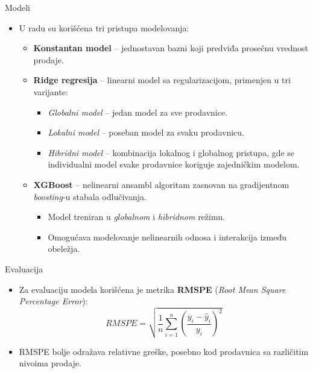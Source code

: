 \documentclass[serif, aspectratio=169]{beamer}
\begin{document}
\begin{frame}{Modeli}
\begin{itemize}
    \item U radu su korišćena tri pristupa modelovanja:
    \begin{itemize}
        \item \textbf{Konstantan model} – jednostavan bazni koji predviđa prosečnu vrednost prodaje.
        \vspace{0.3em}
        \item \textbf{Ridge regresija} – linearni model sa regularizacijom, primenjen u tri varijante:
        \begin{itemize}
            \item \textit{Globalni model} – jedan model za sve prodavnice.
            \item \textit{Lokalni model} – poseban model za svaku prodavnicu.
            \item \textit{Hibridni model} – kombinacija lokalnog i globalnog pristupa, gde se individualni model svake prodavnice koriguje zajedničkim modelom.
        \end{itemize}

        \item \textbf{XGBoost} – nelinearni ansambl algoritam zasnovan na gradijentnom \textit{boosting}-u stabala odlučivanja.
        \begin{itemize}
            \item Model treniran u \textit{globalnom} i \textit{hibridnom} režimu.
            \item Omogućava modelovanje nelinearnih odnosa i interakcija između obeležja.
        \end{itemize}
    \end{itemize}
\end{itemize}
\end{frame}

\begin{frame}{Evaluacija}
\begin{itemize}

    \vspace{1em}

    \item Za evaluaciju modela korišćena je metrika \textbf{RMSPE} (\textit{Root Mean Square Percentage Error}):
    \[
    RMSPE = \sqrt{\frac{1}{n} \sum_{i=1}^{n} 
    \left( \frac{y_i - \hat{y}_i}{y_i} \right)^2}
    \]

    \item RMSPE bolje odražava relativne greške, posebno kod prodavnica sa različitim nivoima prodaje.
\end{itemize}
\end{frame}
\end{document}
